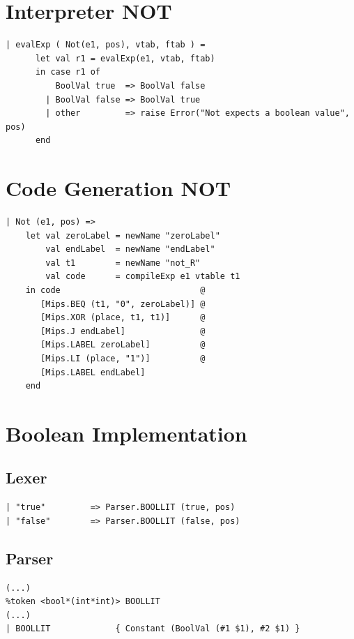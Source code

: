 \documentclass[11pt]{article}
\begin{document}
    \newpage
    \section{Interpreter NOT} \label{interpreter_not}
    \begin{lstlisting}[basicstyle=\small]
| evalExp ( Not(e1, pos), vtab, ftab ) =
      let val r1 = evalExp(e1, vtab, ftab)
      in case r1 of
          BoolVal true  => BoolVal false
        | BoolVal false => BoolVal true
        | other         => raise Error("Not expects a boolean value", pos)
      end
    \end{lstlisting}

    \newpage
    \section{Code Generation NOT} \label{code_gen_not}
    \begin{lstlisting}[basicstyle=\small]
| Not (e1, pos) =>
    let val zeroLabel = newName "zeroLabel"
        val endLabel  = newName "endLabel"
        val t1        = newName "not_R"
        val code      = compileExp e1 vtable t1
    in code                            @
       [Mips.BEQ (t1, "0", zeroLabel)] @
       [Mips.XOR (place, t1, t1)]      @
       [Mips.J endLabel]               @
       [Mips.LABEL zeroLabel]          @
       [Mips.LI (place, "1")]          @
       [Mips.LABEL endLabel]
    end
    \end{lstlisting}

    \newpage
    \section{Boolean Implementation} \label{boolean_implementation}
    \subsection{Lexer}
    \begin{lstlisting}[basicstyle=\small]
| "true"         => Parser.BOOLLIT (true, pos)
| "false"        => Parser.BOOLLIT (false, pos)
    \end{lstlisting}

    \subsection{Parser}
    \begin{lstlisting}[basicstyle=\small]
(...)
%token <bool*(int*int)> BOOLLIT
(...)
| BOOLLIT             { Constant (BoolVal (#1 $1), #2 $1) }
    \end{lstlisting}
\end{document}
